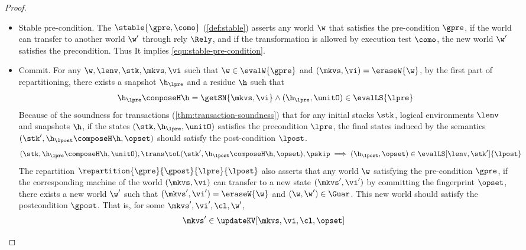 \begin{proof}
\begin{itemize}
\begin{itemize}
\item Stable pre-condition.
The \( \stable{\gpre, \como} \) (\cref{def:stable}) asserts any world \( \w \) that satisfies the pre-condition \( \gpre \), 
if the world can transfer to another world \( \w' \) through rely \( \Rely \), and if the transformation is allowed  by execution test \( \como \), 
the new world \( \w' \) satisfies the precondition.
Thus It implies \cref{equ:stable-pre-condition}. 

\item Commit.
For any \( \w, \lenv, \stk, \mkvs, \vi \) such that \( \w \in \evalW{\gpre} \) and \( (\mkvs, \vi) = \eraseW{\w} \), by the first part of repartitioning,
there exists a snapshot \( \h_\lpre\) and a residue \( \h \) such that
\begin{equation}
\label{equ:local-pre-condition}
\h_\lpre \composeH \h = \getSN{\mkvs, \vi} \land (\h_\lpre, \unitO) \in \evalLS{\lpre}
\end{equation}
Because of the soundness for transactions (\cref{thm:transaction-soundness}) that for any initial stacks \( \stk \), logical environments \( \lenv \) and snapshots \( \h \), 
if the states \( (\stk, \h_\lpre, \unitO) \) satisfies the precondition \( \lpre \), the final states induced by the semantics \( (\stk', \h_\lpost \composeH \h, \opset) \) should satisfy the post-condition \( \lpost \).
\begin{equation}
\label{equ:local-transaction-sound}
\begin{array}{@{}l}
    (\stk, \h_\lpre \composeH \h, \unitO), \trans \toL (\stk', \h_\lpost \composeH \h, \opset), \pskip
    \implies (\h_\lpost, \opset) \in \evalLS[\lenv,\stk']{\lpost}
\end{array}
\end{equation}
The repartition \( \repartition{\gpre}{\gpost}{\lpre}{\lpost} \) also asserts that any world \( \w \) satisfying the pre-condition \( \gpre \), 
if the corresponding machine of the world \( (\mkvs, \vi) \) can transfer to a new state \(  (\mkvs', \vi') \) by committing the fingerprint \( \opset \),
there exists a new world \( \w' \) such that \( (\mkvs', \vi') = \eraseW{\w} \) and \( (\w, \w') \in \Guar \).
This new world should satisfy the postcondition \( \gpost \).
That is, for some \( \mkvs', \vi', \cl, \w' \),
\begin{equation}                                    
\label{equ:repartition}
\begin{array}{@{}l}
    \mkvs' \in \updateKV[\mkvs, \vi, \cl, \opset]

\end{array}
\end{equation}
\end{itemize}
\end{itemize}
\end{proof}

